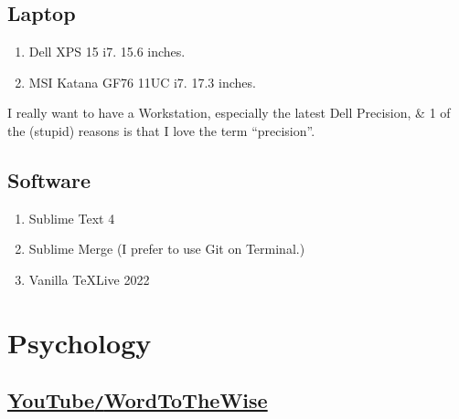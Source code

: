 \documentclass{article}
\begin{document}
\subsection{Laptop}

\begin{enumerate}
	\item {\sc Dell XPS 15 i7.} 15.6 inches.
	\item {\sc MSI Katana GF76 11UC i7.} 17.3 inches.
\end{enumerate}
I really want to have a Workstation, especially the latest {\sc Dell Precision}, \& 1 of the (stupid) reasons is that I love the term ``precision''.

\subsection{Software}

\begin{enumerate}
	\item Sublime Text 4
	\item Sublime Merge (I prefer to use Git on Terminal.)
	\item Vanilla \TeX Live 2022
\end{enumerate}



\section{Psychology}

\subsection{\href{https://www.youtube.com/channel/UCLb_x8TboHIoO0F7uYSl4Ww}{YouTube{\tt/}WordToTheWise}}
\end{document}
